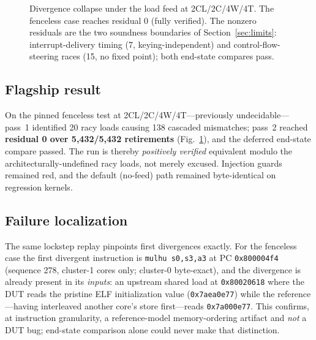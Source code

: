 \documentclass[conference]{IEEEtran}
\newcommand{\code}[1]{\texttt{\small #1}}
\begin{document}
\begin{figure}[t]
\centering
{}
\caption{Divergence collapse under the load feed at 2CL/2C/4W/4T. The
fenceless case reaches residual 0 (fully verified). The nonzero
residuals are the two soundness boundaries of
Section~\ref{sec:limits}: interrupt-delivery timing (7,
keying-independent) and control-flow-steering races (15, no
fixed point); both end-state compares pass.}
\label{fig:residual}
\end{figure}

\subsection{Flagship result}
On the pinned fenceless test at 2CL/2C/4W/4T---previously undecidable---%
pass~1 identified 20 racy loads causing 138 cascaded mismatches; pass~2
reached \textbf{residual 0 over 5{,}432/5{,}432 retirements}
(Fig.~\ref{fig:residual}), and the
deferred end-state compare passed. The run is thereby \emph{positively
verified} equivalent modulo the architecturally-undefined racy loads,
not merely excused. Injection guards remained red, and the default
(no-feed) path remained byte-identical on regression kernels.

\subsection{Failure localization}
The same lockstep replay pinpoints first divergences exactly. For the
fenceless case the first divergent instruction is
\code{mulhu s0,s3,a3} at PC \code{0x800004f4} (sequence 278,
cluster-1 cores only; cluster-0 byte-exact), and the divergence is
already present in its \emph{inputs}: an upstream shared load at
\code{0x80020618} where the DUT reads the pristine ELF
initialization value (\code{0x7aea0e77}) while the reference---having
interleaved another core's store first---reads \code{0x7a000e77}. This
confirms, at instruction granularity, a reference-model
memory-ordering artifact and \emph{not} a DUT bug; end-state
comparison alone could never make that distinction.
\end{document}
